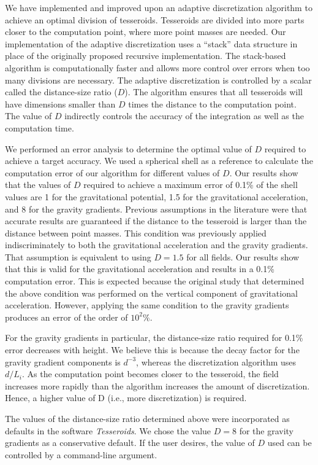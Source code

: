 \documentclass[manuscript,endfloat]{geophysics}
\begin{document}
We have implemented and improved upon an adaptive discretization algorithm to
achieve an optimal division of tesseroids.
Tesseroids are divided into more parts closer to the computation point,
where more point masses are needed.
Our implementation of the adaptive discretization uses a ``stack'' data
structure in place of the originally proposed recursive implementation.
The stack-based algorithm is computationally faster and allows more control
over errors when too many divisions are necessary.
The adaptive discretization is controlled by
a scalar called the distance-size ratio ($D$).
The algorithm ensures that all tesseroids will
have dimensions smaller than $D$ times the distance to the computation point.
The value of $D$ indirectly controls the accuracy of the integration as well as
the computation time.


We performed an error analysis to determine
the optimal value of $D$ required to achieve a target accuracy.
We used a spherical shell as a reference to calculate the computation error of
our algorithm for different values of $D$.
Our results show that the values of $D$ required to achieve a maximum error
of 0.1\% of the shell values are
1 for the gravitational potential, 1.5 for the gravitational acceleration,
and 8 for the gravity gradients.
Previous assumptions in the literature
were that accurate results are guaranteed if
the distance to the tesseroid is larger than
the distance between point masses.
This condition was previously applied indiscriminately
to both the gravitational acceleration and the gravity gradients.
That assumption is equivalent to using $D=1.5$ for all fields.
Our results show that this is valid for the gravitational
acceleration and results in a 0.1\% computation error.
This is expected because the original study that determined the above condition
was performed on the vertical component of gravitational acceleration.
However, applying the same condition to the gravity gradients produces
an error of the order of $10^2\%$.


For the gravity gradients in particular,
the distance-size ratio required for 0.1\% error decreases with height.
We believe this is because the decay factor for
the gravity gradient components is $d^{-3}$,
whereas the discretization algorithm uses $d/L_i$.
As the computation point becomes closer to the tesseroid,
the field increases more rapidly than
the algorithm increases the amount of discretization.
Hence, a higher value of D (i.e., more discretization)
is required.


The values of the distance-size ratio determined above were
incorporated as defaults in the software \emph{Tesseroids}.
We chose the value $D=8$ for the gravity gradients as a conservative default.
If the user desires, the value of $D$ used can be controlled by a command-line
argument.
\end{document}
